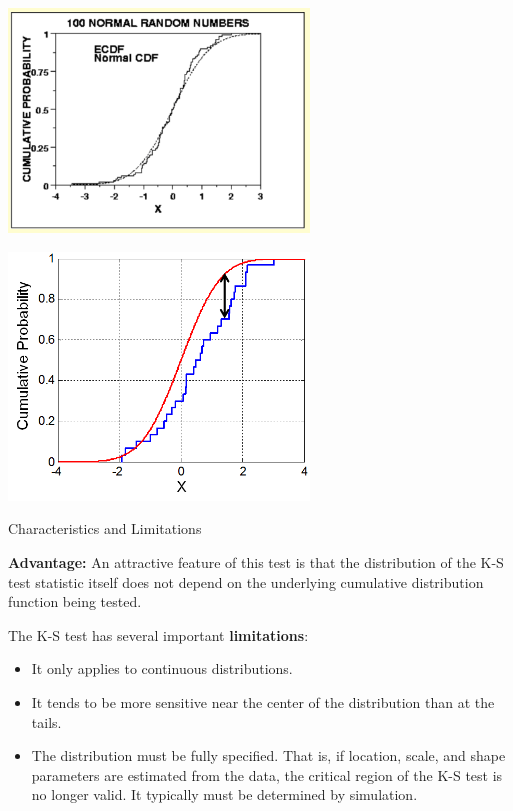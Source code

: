 \documentclass{beamer}
\begin{document}
\begin{frame}
{\centerline{}}


\begin{center}
\includegraphics[width=8cm]{P2023.AIBCCSS.InferenceAndLogisticRegression/kst.png}
\end{center}

\end{frame}

\begin{frame}
{\centerline{}}


\begin{center}
\includegraphics[width=8cm]{P2023.AIBCCSS.InferenceAndLogisticRegression/KS_Example.png}
\end{center}

\end{frame}

\begin{frame}
{\centerline{Characteristics and Limitations}}
\textbf{Advantage:} An attractive feature of this test is that the distribution of the K-S test statistic itself does not depend on the underlying cumulative distribution function being tested.
\newline

The K-S test has several important \textbf{limitations}:
\begin{itemize}
\item It only applies to continuous distributions.
\item It tends to be more sensitive near the center of the distribution than at the tails.
\item The distribution must be fully specified. That is, if location, scale, and shape parameters are estimated from the data, the critical region of the K-S test is no longer valid. It typically must be determined by simulation.
\end{itemize}
\end{frame}
\end{document}
